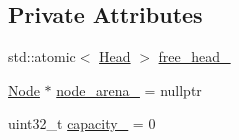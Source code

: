 \subsection*{Private Attributes}
\begin{DoxyCompactItemize}
\item 
std\-::atomic$<$ \hyperlink{structapollo_1_1cyber_1_1base_1_1CCObjectPool_1_1Head}{Head} $>$ \hyperlink{classapollo_1_1cyber_1_1base_1_1CCObjectPool_a40fd41481676d2e6ddac5d3237e7f234}{free\-\_\-head\-\_\-}
\item 
\hyperlink{structapollo_1_1cyber_1_1base_1_1CCObjectPool_1_1Node}{Node} $\ast$ \hyperlink{classapollo_1_1cyber_1_1base_1_1CCObjectPool_ad5fdd44b05eac5aa18d54fdec5928dfb}{node\-\_\-arena\-\_\-} = nullptr
\item 
uint32\-\_\-t \hyperlink{classapollo_1_1cyber_1_1base_1_1CCObjectPool_a3aaed740b510502df0ac4190b8e1734f}{capacity\-\_\-} = 0
\end{DoxyCompactItemize}


